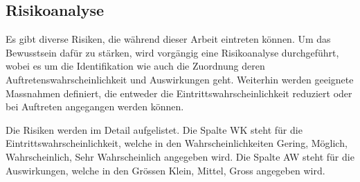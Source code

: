\newpage
\subsection{Risikoanalyse}
Es gibt diverse Risiken, die während dieser Arbeit eintreten können. Um das Bewusstsein dafür zu stärken,
wird vorgängig eine Risikoanalyse durchgeführt, wobei es um die Identifikation wie auch die Zuordnung deren
Auftretenswahrscheinlichkeit und Auswirkungen geht. Weiterhin werden geeignete Massnahmen definiert, die entweder
die Eintrittswahrscheinlichkeit reduziert oder bei Auftreten angegangen werden können.

Die Risiken werden im Detail aufgelistet. Die Spalte \glqq WK\grqq{} steht für die Eintrittswahrscheinlichkeit, welche
in den Wahrscheinlichkeiten \glqq Gering\grqq, \glqq Möglich\grqq, \glqq Wahrscheinlich\grqq, \glqq Sehr Wahrscheinlich\grqq{}
angegeben wird. Die Spalte \glqq AW\grqq{} steht für die Auswirkungen, welche in den Grössen \glqq Klein\grqq, \glqq Mittel\grqq, \glqq Gross\grqq{}
angegeben wird.

